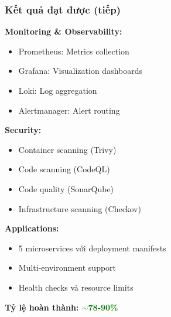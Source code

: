 \documentclass[aspectratio=169]{beamer}
\begin{document}
\begin{frame}
\frametitle{Kết quả đạt được (tiếp)}
\textbf{Monitoring \& Observability:}
\begin{itemize}
    \item[$\checkmark$] Prometheus: Metrics collection
    \item[$\checkmark$] Grafana: Visualization dashboards
    \item[$\checkmark$] Loki: Log aggregation
    \item[$\checkmark$] Alertmanager: Alert routing
\end{itemize}

\vspace{0.3cm}
\textbf{Security:}
\begin{itemize}
    \item[$\checkmark$] Container scanning (Trivy)
    \item[$\checkmark$] Code scanning (CodeQL)
    \item[$\checkmark$] Code quality (SonarQube)
    \item[$\checkmark$] Infrastructure scanning (Checkov)
\end{itemize}

\vspace{0.3cm}
\textbf{Applications:}
\begin{itemize}
    \item[$\checkmark$] 5 microservices với deployment manifests
    \item[$\checkmark$] Multi-environment support
    \item[$\checkmark$] Health checks và resource limits
\end{itemize}

\vspace{0.3cm}
\textbf{Tỷ lệ hoàn thành: \textcolor{green}{$\sim$78-90\%}}
\end{frame}
\end{document}

